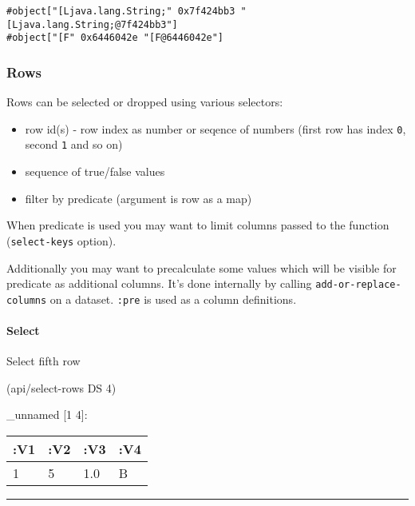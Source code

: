\documentclass[]{article}
\newenvironment{Shaded}{\begin{snugshade}}{\end{snugshade}}
\newcommand{\DecValTok}[1]{\textcolor[rgb]{0.00,0.00,0.81}{#1}}
\newcommand{\NormalTok}[1]{#1}
\providecommand{\tightlist}{%
  \setlength{\itemsep}{0pt}\setlength{\parskip}{0pt}}
\let\oldparagraph\paragraph
\renewcommand{\paragraph}[1]{\oldparagraph{#1}\mbox{}}
\begin{document}
\begin{verbatim}
#object["[Ljava.lang.String;" 0x7f424bb3 "[Ljava.lang.String;@7f424bb3"]
#object["[F" 0x6446042e "[F@6446042e"]
\end{verbatim}

\hypertarget{rows}{%
\subsubsection{Rows}\label{rows}}

Rows can be selected or dropped using various selectors:

\begin{itemize}
\tightlist
\item
  row id(s) - row index as number or seqence of numbers (first row has
  index \texttt{0}, second \texttt{1} and so on)
\item
  sequence of true/false values
\item
  filter by predicate (argument is row as a map)
\end{itemize}

When predicate is used you may want to limit columns passed to the
function (\texttt{select-keys} option).

Additionally you may want to precalculate some values which will be
visible for predicate as additional columns. It's done internally by
calling \texttt{add-or-replace-columns} on a dataset. \texttt{:pre} is
used as a column definitions.

\hypertarget{select-1}{%
\paragraph{Select}\label{select-1}}

Select fifth row

\begin{Shaded}
\begin{Highlighting}[]
\NormalTok{(api/select-rows DS }\DecValTok{4}\NormalTok{)}
\end{Highlighting}
\end{Shaded}

\_unnamed {[}1 4{]}:

\begin{longtable}[]{@{}llll@{}}
\toprule
:V1 & :V2 & :V3 & :V4\tabularnewline
\midrule
\endhead
1 & 5 & 1.0 & B\tabularnewline
\bottomrule
\end{longtable}

\begin{center}\rule{0.5\linewidth}{0.5pt}\end{center}
\end{document}
